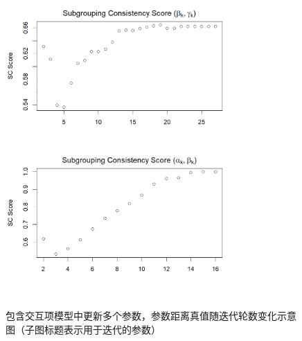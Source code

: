 \documentclass[12pt, a4paper, oneside]{article}
\numberwithin{equation}{section}
\begin{document}
\begin{figure}
{\begin{minipage}[t]{0.5\linewidth}
			\vspace{0.02cm}
			\includegraphics[width=3.5in]{img/split_except_alpha_sc.png}\\
			\vspace{0.02cm}
			\includegraphics[width=3.5in]{img/split_except_gamma_sc.png}\\
		\end{minipage}%
	}%
	\centering
	\caption{包含交互项模型中更新多个参数，参数距离真值随迭代轮数变化示意图（子图标题表示用于迭代的参数）}
	\vspace{-0.2cm}
	\label{fig:split2}
\end{figure}
\end{document}
